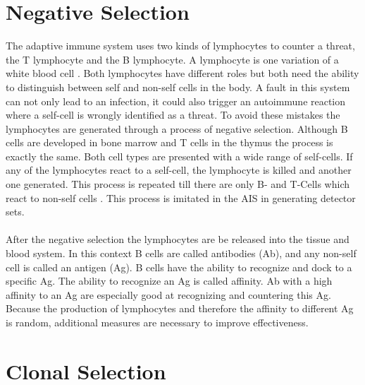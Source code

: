 \section{Negative Selection}

The adaptive immune system uses two kinds of lymphocytes to counter a threat, the T lymphocyte and the B lymphocyte. A lymphocyte is one variation of a white blood cell \cite{immunebio}.  Both lymphocytes have different roles but both need the ability to distinguish between self and non-self cells in the body. A fault in this system can not only lead to an infection, it could also trigger an autoimmune reaction where a self-cell is wrongly identified as a threat. To avoid these mistakes the lymphocytes are generated through a process of negative selection. Although B cells are developed in bone marrow and T cells in the thymus the process is exactly the same. Both cell types are presented with a wide range of self-cells. If any of the lymphocytes react to a self-cell, the lymphocyte is killed and another one generated. This process is repeated till there are only B- and T-Cells which react to non-self cells \cite{tan2016artificial}. This process is imitated in the AIS in generating detector sets.
\\\\
After the negative selection the lymphocytes are be released into the tissue and blood system. In this context B cells are called antibodies (Ab), and any non-self cell is called an antigen (Ag). B cells have the ability to recognize and dock to a specific Ag. The ability to recognize an Ag is called affinity. Ab with a high affinity to an Ag are especially good at recognizing and countering this Ag. Because the production of lymphocytes and therefore the affinity to different Ag is random, additional measures are necessary to improve effectiveness.

\section{Clonal Selection}

